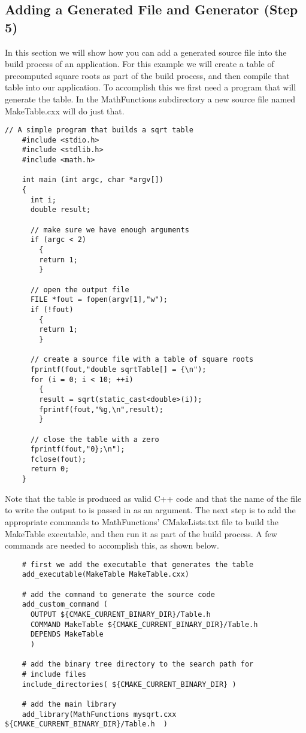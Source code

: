 \documentclass[UTF8,a4paper,8pt]{ctexart}
\begin{document}
\subsection{Adding a Generated File and Generator (Step 5)}
	In this section we will show how you can add a generated source file into the build process of an application. For this example we will create a table of precomputed square roots as part of the build process, and then compile that table into our application. To accomplish this we first need a program that will generate the table. In the MathFunctions subdirectory a new source file named MakeTable.cxx will do just that.
	\begin{lstlisting}[frame = lines]
	// A simple program that builds a sqrt table 
	#include <stdio.h>
	#include <stdlib.h>
	#include <math.h>
	 
	int main (int argc, char *argv[])
	{
	  int i;
	  double result;
	 
	  // make sure we have enough arguments
	  if (argc < 2)
	    {
	    return 1;
	    }
	  
	  // open the output file
	  FILE *fout = fopen(argv[1],"w");
	  if (!fout)
	    {
	    return 1;
	    }
	  
	  // create a source file with a table of square roots
	  fprintf(fout,"double sqrtTable[] = {\n");
	  for (i = 0; i < 10; ++i)
	    {
	    result = sqrt(static_cast<double>(i));
	    fprintf(fout,"%g,\n",result);
	    }
	 
	  // close the table with a zero
	  fprintf(fout,"0};\n");
	  fclose(fout);
	  return 0;
	}	
	\end{lstlisting}
	
	Note that the table is produced as valid C++ code and that the name of the file to write the output to is passed in as an argument. The next step is to add the appropriate commands to MathFunctions’ CMakeLists.txt file to build the MakeTable executable, and then run it as part of the build process. A few commands are needed to accomplish this, as shown below.
	\begin{lstlisting}
	# first we add the executable that generates the table
	add_executable(MakeTable MakeTable.cxx)
	 
	# add the command to generate the source code
	add_custom_command (
	  OUTPUT ${CMAKE_CURRENT_BINARY_DIR}/Table.h
	  COMMAND MakeTable ${CMAKE_CURRENT_BINARY_DIR}/Table.h
	  DEPENDS MakeTable
	  )
	 
	# add the binary tree directory to the search path for 
	# include files
	include_directories( ${CMAKE_CURRENT_BINARY_DIR} )
	 
	# add the main library
	add_library(MathFunctions mysqrt.cxx ${CMAKE_CURRENT_BINARY_DIR}/Table.h  )	
	\end{lstlisting}	
	
\end{document}
